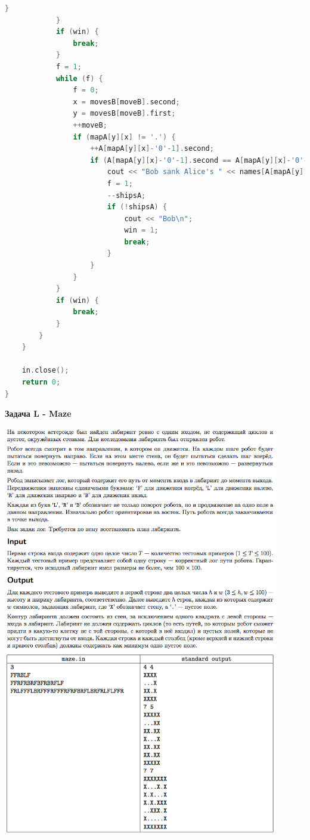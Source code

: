 \documentclass[a4paper,12pt]{article}
\begin{document}
\begin{lstlisting}[language=C++]
                }
            }
            if (win) {
                break;
            }
            f = 1;
            while (f) {
                f = 0;
                x = movesB[moveB].second;
                y = movesB[moveB].first;
                ++moveB;
                if (mapA[y][x] != '.') {
                    ++A[mapA[y][x]-'0'-1].second;
                    if (A[mapA[y][x]-'0'-1].second == A[mapA[y][x]-'0'-1].first) {
                        cout << "Bob sank Alice's " << names[A[mapA[y][x]-'0'-1].first-1] << '\n';
                        f = 1;
                        --shipsA;
                        if (!shipsA) {
                            cout << "Bob\n";
                            win = 1;
                            break;
                        }
                    }
                }
            }
            if (win) {
                break;
            }
        }
    }

    in.close();
    return 0;
}
\end{lstlisting}

\textbf{{\large Задача L - Maze}} \\
\begin{center}
\includegraphics[width=0.9\textwidth]{OC_Karelia/OC_Karelia_L1.png}\\ [1cm]
\includegraphics[width=0.9\textwidth]{OC_Karelia/OC_Karelia_L2.png}\\ [1cm]
\end{center}
\newpage
\end{document}
